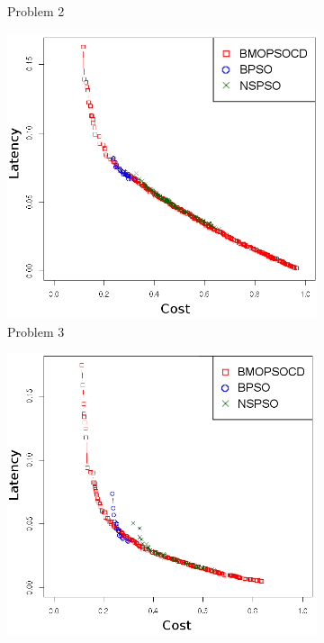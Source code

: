 \begin{figure}[]
\begin{subfigure}{0.30\textwidth}
	   \caption{Problem 2}
   \end{subfigure}
   \begin{subfigure}{0.30\textwidth}
       \includegraphics[width=\textwidth]{pics/total3.png}
	   \caption{Problem 3}
   \end{subfigure}
      \begin{subfigure}{0.30\textwidth}
       \includegraphics[width=\textwidth]{pics/total4.png}

\end{subfigure}
\end{figure}
